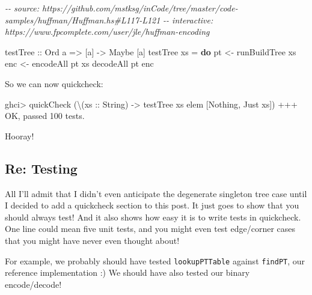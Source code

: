 \documentclass[]{article}
\newenvironment{Shaded}{}{}
\newcommand{\CommentTok}[1]{\textcolor[rgb]{0.38,0.63,0.69}{\textit{#1}}}
\newcommand{\DataTypeTok}[1]{\textcolor[rgb]{0.56,0.13,0.00}{#1}}
\newcommand{\DecValTok}[1]{\textcolor[rgb]{0.25,0.63,0.44}{#1}}
\newcommand{\KeywordTok}[1]{\textcolor[rgb]{0.00,0.44,0.13}{\textbf{#1}}}
\newcommand{\NormalTok}[1]{#1}
\newcommand{\OperatorTok}[1]{\textcolor[rgb]{0.40,0.40,0.40}{#1}}
\newcommand{\OtherTok}[1]{\textcolor[rgb]{0.00,0.44,0.13}{#1}}
\begin{document}
\begin{Shaded}
\begin{Highlighting}[]
\CommentTok{{-}{-} source: https://github.com/mstksg/inCode/tree/master/code{-}samples/huffman/Huffman.hs\#L117{-}L121}
\CommentTok{{-}{-} interactive: https://www.fpcomplete.com/user/jle/huffman{-}encoding}

\OtherTok{testTree\textquotesingle{} ::} \DataTypeTok{Ord}\NormalTok{ a }\OtherTok{=\textgreater{}}\NormalTok{ [a] }\OtherTok{{-}\textgreater{}} \DataTypeTok{Maybe}\NormalTok{ [a]}
\NormalTok{testTree\textquotesingle{} xs }\OtherTok{=} \KeywordTok{do}
\NormalTok{    pt  }\OtherTok{\textless{}{-}}\NormalTok{ runBuildTree xs}
\NormalTok{    enc }\OtherTok{\textless{}{-}}\NormalTok{ encodeAll pt xs}
\NormalTok{    decodeAll\textquotesingle{} pt enc}
\end{Highlighting}
\end{Shaded}

So we can now quickcheck:

\begin{Shaded}
\begin{Highlighting}[]
\NormalTok{ghci}\OperatorTok{\textgreater{}}\NormalTok{ quickCheck (\textbackslash{}(}\OtherTok{xs ::} \DataTypeTok{String}\NormalTok{) }\OtherTok{{-}\textgreater{}}\NormalTok{ testTree\textquotesingle{} xs }\OtherTok{\textasciigrave{}elem\textasciigrave{}}\NormalTok{ [}\DataTypeTok{Nothing}\NormalTok{, }\DataTypeTok{Just}\NormalTok{ xs])}
\OperatorTok{+++} \DataTypeTok{OK}\NormalTok{, passed }\DecValTok{100}\NormalTok{ tests}\OperatorTok{.}
\end{Highlighting}
\end{Shaded}

Hooray!

\subsection{Re: Testing}\label{re-testing}

All I'll admit that I didn't even anticipate the degenerate singleton tree case
until I decided to add a quickcheck section to this post. It just goes to show
that you should always test! And it also shows how easy it is to write tests in
quickcheck. One line could mean five unit tests, and you might even test
edge/corner cases that you might have never even thought about!

For example, we probably should have tested \texttt{lookupPTTable} against
\texttt{findPT}, our reference implementation :) We should have also tested our
binary encode/decode!
\end{document}
